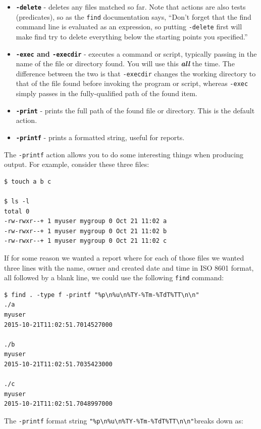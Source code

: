 \documentclass[10pt,]{book}
\numberwithin{figure}{chapter}
\begin{document}
\begin{itemize}
\item
  \textbf{\texttt{-delete}} - deletes any files matched so far. Note
  that actions are also tests (predicates), so as the \texttt{find}
  documentation says, ``Don't forget that the find command line is
  evaluated as an expression, so putting \texttt{-delete} first will
  make find try to delete everything below the starting points you
  specified.''
\item
  \textbf{\texttt{-exec} and \texttt{-execdir}} - executes a command or
  script, typically passing in the name of the file or directory found.
  You will use this \textbf{\emph{all}} the time. The difference between
  the two is that \texttt{-execdir} changes the working directory to
  that of the file found before invoking the program or script, whereas
  \texttt{-exec} simply passes in the fully-qualified path of the found
  item.
\item
  \textbf{\texttt{-print}} - prints the full path of the found file or
  directory. This is the default action.
\item
  \textbf{\texttt{-printf}} - prints a formatted string, useful for
  reports.
\end{itemize}

The \texttt{-printf} action allows you to do some interesting things
when producing output. For example, consider these three files:

\begin{verbatim}
$ touch a b c

$ ls -l
total 0
-rw-rwxr--+ 1 myuser mygroup 0 Oct 21 11:02 a
-rw-rwxr--+ 1 myuser mygroup 0 Oct 21 11:02 b
-rw-rwxr--+ 1 myuser mygroup 0 Oct 21 11:02 c
\end{verbatim}

If for some reason we wanted a report where for each of those files we
wanted three lines with the name, owner and created date and time in ISO
8601 format, all followed by a blank line, we could use the following
\texttt{find} command:

\begin{verbatim}
$ find . -type f -printf "%p\n%u\n%TY-%Tm-%TdT%TT\n\n"
./a
myuser
2015-10-21T11:02:51.7014527000

./b
myuser
2015-10-21T11:02:51.7035423000

./c
myuser
2015-10-21T11:02:51.7048997000
\end{verbatim}

The \texttt{-printf} format string
\texttt{"\%p\textbackslash{}n\%u\textbackslash{}n\%TY-\%Tm-\%TdT\%TT\textbackslash{}n\textbackslash{}n"}breaks
down as:
\end{document}
